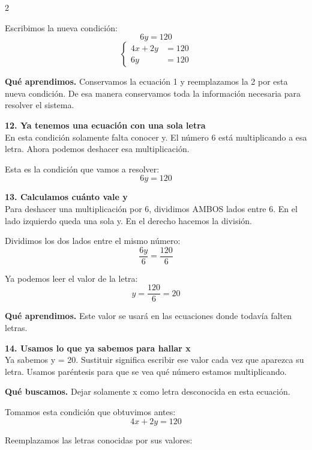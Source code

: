\documentclass[11pt,a4paper,landscape]{article}
\begin{document}
\begin{multicols*}{2}
\begin{minipage}{\linewidth}
\par\smallskip Escribimos la nueva condición:
\[6y = 120\]
\[\left\{\begin{aligned}4x + 2y &= 120\\6y &= 120\end{aligned}\right.\]
\par\smallskip\textbf{Qué aprendimos.} Conservamos la ecuación 1 y reemplazamos la 2 por esta nueva condición. De esa manera conservamos toda la información necesaria para resolver el sistema.
\end{minipage}\par\medskip
\noindent\begin{minipage}{\linewidth}\textbf{12. Ya tenemos una ecuación con una sola letra}\\[2pt]En esta condición solamente falta conocer y. El número 6 está multiplicando a esa letra. Ahora podemos deshacer esa multiplicación.
\par\smallskip Esta es la condición que vamos a resolver:
\[6y = 120\]
\end{minipage}\par\medskip
\noindent\begin{minipage}{\linewidth}\textbf{13. Calculamos cuánto vale y}\\[2pt]Para deshacer una multiplicación por 6, dividimos AMBOS lados entre 6. En el lado izquierdo queda una sola y. En el derecho hacemos la división.
\par\smallskip Dividimos los dos lados entre el mismo número:
\[\frac{6y}{6}=\frac{120}{6}\]
\par\smallskip Ya podemos leer el valor de la letra:
\[y=\frac{120}{6}=20\]
\par\smallskip\textbf{Qué aprendimos.} Este valor se usará en las ecuaciones donde todavía falten letras.
\end{minipage}\par\medskip
\noindent\begin{minipage}{\linewidth}\textbf{14. Usamos lo que ya sabemos para hallar x}\\[2pt]Ya sabemos y = 20. Sustituir significa escribir ese valor cada vez que aparezca su letra. Usamos paréntesis para que se vea qué número estamos multiplicando.
\par\smallskip\textbf{Qué buscamos.} Dejar solamente x como letra desconocida en esta ecuación.
\par\smallskip Tomamos esta condición que obtuvimos antes:
\[4x + 2y = 120\]
\par\smallskip Reemplazamos las letras conocidas por sus valores:

\end{minipage}
\end{multicols*}
\end{document}
